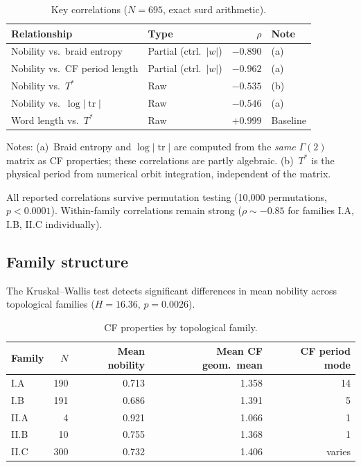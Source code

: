 \documentclass[11pt]{article}
\theoremstyle{definition}
\DeclareMathOperator{\tr}{tr}
\begin{document}
\begin{table}[ht]
\centering
\caption{Key correlations ($N = 695$, exact surd arithmetic).}
\label{tab:correlations}
\begin{tabular}{llrl}
\toprule
Relationship & Type & $\rho$ & Note \\
\midrule
Nobility vs.\ braid entropy & Partial (ctrl.\ $|w|$)
  & $-0.890$ & (a) \\
Nobility vs.\ CF period length & Partial (ctrl.\ $|w|$)
  & $-0.962$ & (a) \\
Nobility vs.\ $T^*$ & Raw & $-0.535$ & (b) \\
Nobility vs.\ $\log|\tr|$ & Raw & $-0.546$ & (a) \\
Word length vs.\ $T^*$ & Raw & $+0.999$ & Baseline \\
\bottomrule
\end{tabular}

\medskip
\small
Notes: (a)~Braid entropy and $\log|\tr|$ are computed from the
\emph{same} $\Gamma(2)$ matrix as CF properties; these correlations
are partly algebraic. (b)~$T^*$ is the physical period from numerical
orbit integration, independent of the matrix.
\end{table}

All reported correlations survive permutation testing (10,000
permutations, $p < 0.0001$). Within-family correlations remain
strong ($\rho \sim -0.85$ for families I.A, I.B, II.C
individually).

\subsection{Family structure}

The Kruskal--Wallis test detects significant differences in mean
nobility across topological families ($H = 16.36$, $p = 0.0026$).

\begin{table}[ht]
\centering
\caption{CF properties by topological family.}
\label{tab:families}
\begin{tabular}{lrrrr}
\toprule
Family & $N$ & Mean nobility & Mean CF geom.\ mean & CF period mode \\
\midrule
I.A   & 190 & 0.713 & 1.358 & 14 \\
I.B   & 191 & 0.686 & 1.391 & 5 \\
II.A  & 4   & 0.921 & 1.066 & 1 \\
II.B  & 10  & 0.755 & 1.368 & 1 \\
II.C  & 300 & 0.732 & 1.406 & varies \\
\bottomrule
\end{tabular}
\end{table}
\end{document}
